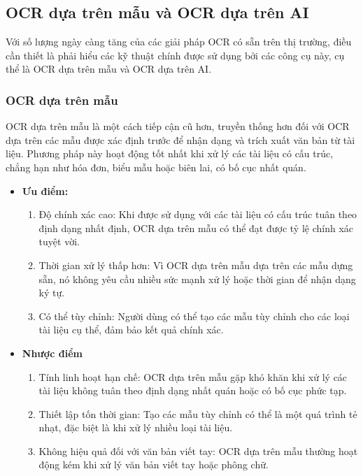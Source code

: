 \subsection{OCR dựa trên mẫu và OCR dựa trên AI}
Với số lượng ngày càng tăng của các giải pháp OCR có sẵn trên thị trường, điều cần thiết là phải hiểu các kỹ thuật chính được sử dụng bởi các công cụ này, cụ thể là OCR dựa trên mẫu và OCR dựa trên AI.
\subsubsection{OCR dựa trên mẫu}
OCR dựa trên mẫu là một cách tiếp cận cũ hơn, truyền thống hơn đối với OCR dựa trên các mẫu được xác định trước để nhận dạng và trích xuất văn bản từ tài liệu. Phương pháp này hoạt động tốt nhất khi xử lý các tài liệu có cấu trúc, chẳng hạn như hóa đơn, biểu mẫu hoặc biên lai, có bố cục nhất quán. \cite{template-ai-ocr}
\begin{itemize}
    \item[] \textbf{Ưu điểm:} \begin{enumerate}
            \item Độ chính xác cao: Khi được sử dụng với các tài liệu có cấu trúc tuân theo định dạng nhất định, OCR dựa trên mẫu có thể đạt được tỷ lệ chính xác tuyệt vời.
            \item Thời gian xử lý thấp hơn: Vì OCR dựa trên mẫu dựa trên các mẫu dựng sẵn, nó không yêu cầu nhiều sức mạnh xử lý hoặc thời gian để nhận dạng ký tự.
            \item Có thể tùy chỉnh: Người dùng có thể tạo các mẫu tùy chỉnh cho các loại tài liệu cụ thể, đảm bảo kết quả chính xác.
        \end{enumerate}
    \item[] \textbf{Nhược điểm} \begin{enumerate}
            \item Tính linh hoạt hạn chế: OCR dựa trên mẫu gặp khó khăn khi xử lý các tài liệu không tuân theo định dạng nhất quán hoặc có bố cục phức tạp.
            \item Thiết lập tốn thời gian: Tạo các mẫu tùy chỉnh có thể là một quá trình tẻ nhạt, đặc biệt là khi xử lý nhiều loại tài liệu.
            \item Không hiệu quả đối với văn bản viết tay: OCR dựa trên mẫu thường hoạt động kém khi xử lý văn bản viết tay hoặc phông chữ.
        \end{enumerate}
\end{itemize}

